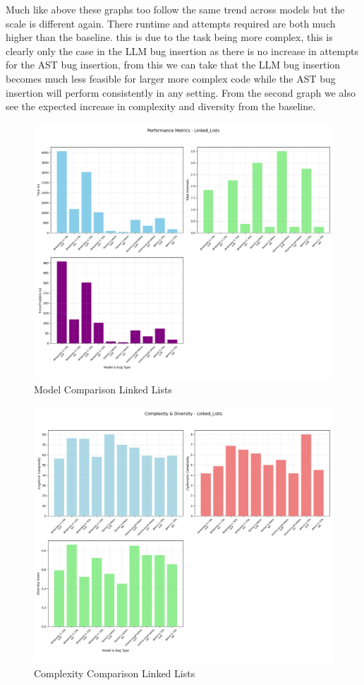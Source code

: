 \documentclass[12pt]{extarticle}
\begin{document}
Much like above these graphs too follow the same trend across models but the scale is different again. There runtime and attempts required are both much higher than the baseline. this is due to the task being more complex, this is clearly only the case in the LLM bug insertion as there is no increase in attempts for the AST bug insertion, from this we can take that the LLM bug insertion becomes much less feasible for larger more complex code while the AST bug insertion will perform consistently in any setting. From the second graph we also see the expected increase in complexity and diversity from the baseline.

\begin{figure}[H]
\centering
\includegraphics[width=0.7\linewidth]{Images/Model_Comparison_Linked_Lists.png}
\caption{Model Comparison Linked Lists}
\label{fig:Model_Comparison_Linked_Lists}
\end{figure}

\begin{figure}[H]
\centering
\includegraphics[width=0.7\linewidth]{Images/Complexity_Comparison_Linked_Lists.png}
\caption{Complexity Comparison Linked Lists}
\label{fig:Complexity_Comparison_Linked_Lists}
\end{figure}
\end{document}
